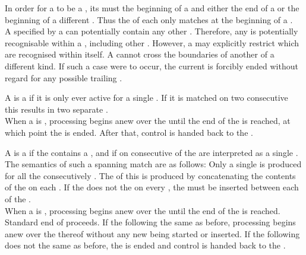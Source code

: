 In order for a  to be a , its  must  the beginning of a  and either the end of a  or the beginning of a different . Thus the  of each  only matches at the beginning of a .\\

A  specified by a  can potentially contain any other . Therefore, any  is potentially recognisable within a , including other . However, a  may explicitly restrict which  are recognised within itself. A  cannot cross the boundaries of another  of a different kind. If such a case were to occur, the current  is forcibly ended without regard for any possible trailing .

A  is a  if it is only ever active for a single . If it is matched on two consecutive  this results in two separate . \\

When a  is , processing begins anew over the  until the end of the  is reached, at which point the  is ended. After that, control is handed back to the .

A  is a  if the  contains a , and if  on consecutive  of the  are interpreted as a single . The semantics of such a spanning match are as follows: Only a single  is produced for all the consecutively  . The  of this  is produced by concatenating the contents of the  on each . If the  does not  the  on every , the  must be inserted between each  of the . \\

When a  is , processing begins anew over the  until the end of the  is reached. Standard end of   proceeds. If the following   the same  as before, processing begins anew over the  thereof without any new  being started or inserted. If the following  does not  the same  as before, the  is ended and control is handed back to the .

